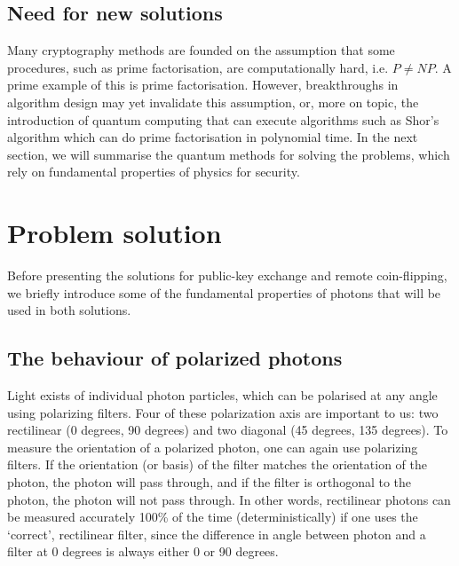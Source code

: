 \documentclass[oneside,a4paper]{article}
\begin{document}

\subsection{Need for new solutions}
Many cryptography methods are founded on the assumption that some procedures, such as prime factorisation, are computationally hard, i.e. $P \neq NP$.
A prime example of this is prime factorisation.
However, breakthroughs in algorithm design may yet invalidate this assumption, or, more on topic, the introduction of quantum computing that can execute algorithms such as Shor's algorithm which can do prime factorisation in polynomial time.
In the next section, we will summarise the quantum methods for solving the problems, which rely on fundamental properties of physics for security.


\section{Problem solution}
Before presenting the solutions for public-key exchange and remote coin-flipping, we briefly introduce some of the fundamental properties of photons that will be used in both solutions.

\subsection{The behaviour of polarized photons}
Light exists of individual photon particles, which can be polarised at any angle using polarizing filters.
Four of these polarization axis are important to us: two rectilinear (0 degrees, 90 degrees) and two diagonal (45 degrees, 135 degrees).
To measure the orientation of a polarized photon, one can again use polarizing filters.
If the orientation (or basis) of the filter matches the orientation of the photon, the photon will pass through, and if the filter is orthogonal to the photon, the photon will not pass through.
In other words, rectilinear photons can be measured accurately 100\% of the time (deterministically) if one uses the `correct', rectilinear filter, since the difference in angle between photon and a filter at 0 degrees is always either 0 or 90 degrees.
\end{document}
